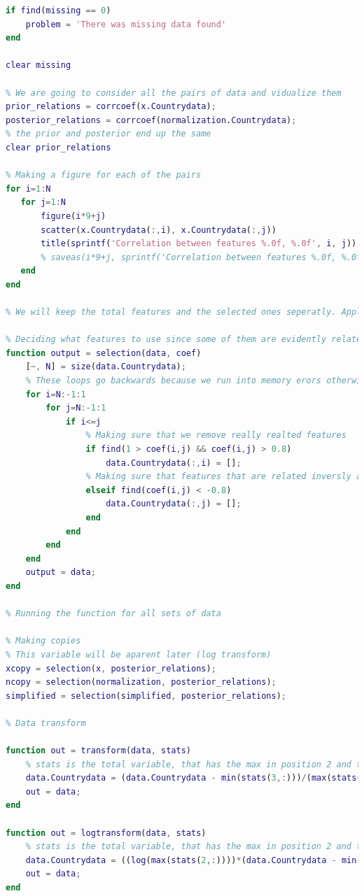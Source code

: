 \documentclass[12pt, a4paper]{article}
\begin{document}
\begin{lstlisting}[language=Matlab, label=lst:final, caption=The entire code as it was upon completion.]
% Showing if we have missing data or not
if find(missing == 0)
    problem = 'There was missing data found'
end

clear missing

% We are going to consider all the pairs of data and vidualize them
prior_relations = corrcoef(x.Countrydata);
posterior_relations = corrcoef(normalization.Countrydata);
% the prior and posterior end up the same
clear prior_relations

% Making a figure for each of the pairs
for i=1:N
   for j=1:N
       figure(i*9+j)
       scatter(x.Countrydata(:,i), x.Countrydata(:,j))
       title(sprintf('Correlation between features %.0f, %.0f', i, j)) 
       % saveas(i*9+j, sprintf('Correlation between features %.0f, %.0f.png', i, j))
   end
end

% We will keep the total features and the selected ones seperatly. Applying the following on both sets of data.

% Deciding what features to use since some of them are evidently related very much
function output = selection(data, coef)
    [~, N] = size(data.Countrydata);
    % These loops go backwards because we run into memory erors otherwise from acessing memory that does not belong to the matrix
    for i=N:-1:1
        for j=N:-1:1
            if i<=j
                % Making sure that we remove really realted features
                if find(1 > coef(i,j) && coef(i,j) > 0.8)
                    data.Countrydata(:,i) = [];
                % Making sure that features that are related inversly are removed
                elseif find(coef(i,j) < -0.8)
                    data.Countrydata(:,j) = [];
                end
            end
        end
    end
    output = data;
end

% Running the function for all sets of data

% Making copies
% This variable will be aparent later (log transform)
xcopy = selection(x, posterior_relations);
ncopy = selection(normalization, posterior_relations);
simplified = selection(simplified, posterior_relations);

% Data transform

function out = transform(data, stats)
    % stats is the total variable, that has the max in position 2 and the min in position 3
    data.Countrydata = (data.Countrydata - min(stats(3,:)))/(max(stats(2,:))-min(stats(3,:)));
    out = data;
end

function out = logtransform(data, stats)
    % stats is the total variable, that has the max in position 2 and the min in position 3
    data.Countrydata = ((log(max(stats(2,:))))*(data.Countrydata - min(stats(3,:))))/(max(stats(2,:))-min(stats(3,:)));
    out = data;
end


\end{lstlisting}
\end{document}
